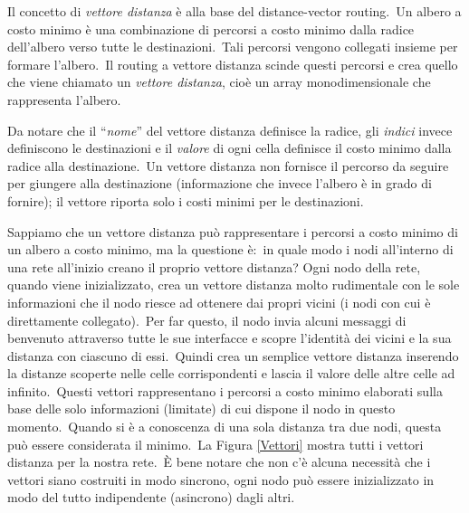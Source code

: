 Il concetto di \emph{vettore distanza} è alla base del distance-vector routing.\
Un albero a costo minimo è una combinazione di percorsi a costo minimo dalla radice dell'albero verso tutte le destinazioni.\
Tali percorsi vengono collegati insieme per formare l'albero.\
Il routing a vettore distanza scinde questi percorsi e crea quello che viene chiamato un \emph{vettore distanza}, cioè un array monodimensionale che rappresenta l'albero.\

Da notare che il ``\emph{nome}'' del vettore distanza definisce la radice, gli \emph{indici} invece definiscono le destinazioni e il \emph{valore} di ogni cella definisce il costo minimo dalla radice alla destinazione.\
Un vettore distanza non fornisce il percorso da seguire per giungere alla destinazione (informazione che invece l'albero è in grado di fornire); il vettore riporta solo i costi minimi per le destinazioni.

Sappiamo che un vettore distanza può rappresentare i percorsi a costo minimo di un albero a costo minimo, ma la questione è:\ in quale modo i nodi all'interno di una rete all'inizio creano il proprio vettore distanza? Ogni nodo della rete, quando viene inizializzato, crea un vettore distanza molto rudimentale con le sole informazioni che il nodo riesce ad ottenere dai propri vicini (i nodi con cui è direttamente collegato).\
Per far questo, il nodo invia alcuni messaggi di benvenuto attraverso tutte le sue interfacce e scopre l'identità dei vicini e la sua distanza con ciascuno di essi.\
Quindi crea un semplice vettore distanza inserendo la distanze scoperte nelle celle corrispondenti e lascia il valore delle altre celle ad infinito.\
Questi vettori rappresentano i percorsi a costo minimo elaborati sulla base delle solo informazioni (limitate) di cui dispone il nodo in questo momento.\
Quando si è a conoscenza di una sola distanza tra due nodi, questa può essere considerata il minimo.\
La Figura \ref{Vettori} mostra tutti i vettori distanza per la nostra rete.\
È bene notare che non c'è alcuna necessità che i vettori siano costruiti in modo sincrono, ogni nodo può essere inizializzato in modo del tutto indipendente (asincrono) dagli altri.

